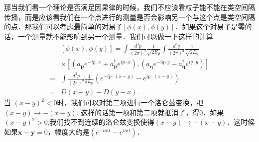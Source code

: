 那当我们看一个理论是否满足因果律的时候，我们不应该看粒子能不能在类空间隔传播，而是应该看我们在一个点进行的测量是否会影响另一个与这个点是类空间隔的点．那我们可以考虑最简单的对易子$[\phi(x),\phi(y)]$．如果这个对易子是零的话，一个测量就不能影响到另一个测量．我们可以做一下这样的计算
\begin{equation}
\begin{aligned}
&[\phi(x), \phi(y)]=\int \frac{d^{3} p}{(2 \pi)^{3}} \frac{1}{\sqrt{2 E_{\mathbf{p}}}} \int \frac{d^{3} q}{(2 \pi)^{3}} \frac{1}{\sqrt{2 E_{\mathbf{q}}}} \\
&\times\left[\left(a_{\mathbf{p}} e^{-i p \cdot x}+a_{\mathbf{p}}^{\dagger} e^{i p \cdot x}\right),\left(a_{\mathbf{q}} e^{-i q \cdot y}+a_{\mathbf{q}}^{\dagger} e^{i q \cdot y}\right)\right] \\
=& \int \frac{d^{3} p}{(2 \pi)^{3}} \frac{1}{2 E_{\mathbf{p}}}\left(e^{-i p \cdot(x-y)}-e^{i p \cdot(x-y)}\right) \\
=& D(x-y)-D(y-x) .
\end{aligned}
\end{equation}
当 $(x-y)^2<0$时，我们可以对第二项进行一个洛仑兹变换，把$(x-y)\rightarrow -(x-y)$. 这样的话第一项和第二项就抵消了，得0．如果$(x-y)^2>0$,我们找不到连续的洛仑兹变换使得$(x-y)\rightarrow - (x-y)$．这时候如果$\mathbf x - \mathbf y = 0$，幅度大约是$(e^{-imt}-e^{imt})$．

